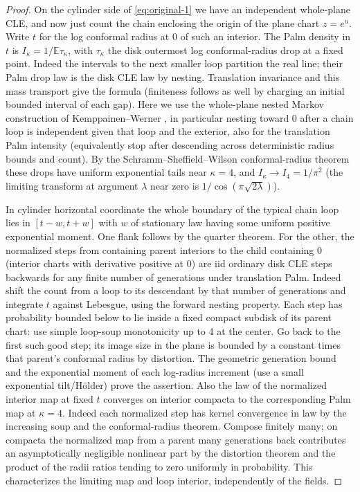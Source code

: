 \begin{proof}
On the cylinder side of \eqref{eq:original-1} we have an independent whole-plane CLE, and now just count the chain enclosing the origin of the plane chart \(z=e^u\).
Write \(t\) for the log conformal radius at 0 of such an interior.
The Palm density in \(t\) is \(I_\kappa=1/\mathbb E\tau_\kappa\), with \(\tau_\kappa\) the disk outermost log conformal-radius drop at a fixed point.
Indeed the intervals to the next smaller loop partition the real line; their Palm drop law is the disk CLE law by nesting.
Translation invariance and this mass transport give the formula (finiteness follows as well by charging an initial bounded interval of each gap).
Here we use the whole-plane nested Markov construction of Kemppainen--Werner \citep{KWnested}, in particular nesting toward 0 after a chain loop is independent given that loop and the exterior, also for the translation Palm intensity (equivalently stop after descending across deterministic radius bounds and count).
By the Schramm--Sheffield--Wilson conformal-radius theorem \citep[Theorem~1]{SSWradii} these drops have uniform exponential tails near \(\kappa=4\), and \(I_\kappa\to I_4=1/\pi^2\) (the limiting transform at argument \(\lambda\) near zero is \(1/\cos(\pi\sqrt{2\lambda})\)).

In cylinder horizontal coordinate the whole boundary of the typical chain loop lies in \([t-w,t+w]\) with \(w\) of stationary law having some uniform positive exponential moment.
One flank follows by the quarter theorem.
For the other, the normalized steps from containing parent interiors to the child containing 0 (interior charts with derivative positive at 0) are iid ordinary disk CLE steps backwards for any finite number of generations under translation Palm.
Indeed shift the count from a loop to its descendant by that number of generations and integrate \(t\) against Lebesgue, using the forward nesting property.
Each step has probability bounded below to lie inside a fixed compact subdisk of its parent chart: use simple loop-soup monotonicity up to 4 at the center.
Go back to the first such good step; its image size in the plane is bounded by a constant times that parent's conformal radius by distortion.
The geometric generation bound and the exponential moment of each log-radius increment (use a small exponential tilt/Hölder) prove the assertion.
Also the law of the normalized interior map at fixed \(t\) converges on interior compacta to the corresponding Palm map at \(\kappa=4\).
Indeed each normalized step has kernel convergence in law by the increasing soup and the conformal-radius theorem.
Compose finitely many; on compacta the normalized map from a parent many generations back contributes an asymptotically negligible nonlinear part by the distortion theorem and the product of the radii ratios tending to zero uniformly in probability.
This characterizes the limiting map and loop interior, independently of the fields.


\end{proof}
